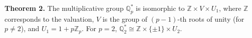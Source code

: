 \textbf{Theorem 2.} The multiplicative group $\mathbb{Q}_p^*$ is isomorphic to $\mathbb{Z} \times V \times U_1$, where $\mathbb{Z}$ corresponds to the valuation, $V$ is the group of $(p-1)$-th roots of unity (for $p \neq 2$), and $U_1 = 1 + p\mathbb{Z}_p$. For $p = 2$, $\mathbb{Q}_2^* \cong \mathbb{Z} \times \{\pm 1\} \times U_2$.
